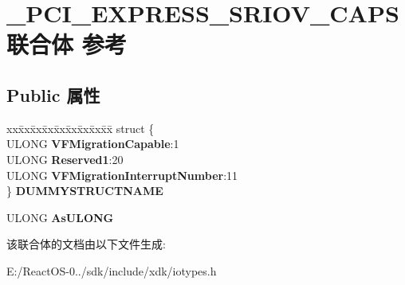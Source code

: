 \hypertarget{union___p_c_i___e_x_p_r_e_s_s___s_r_i_o_v___c_a_p_s}{}\section{\+\_\+\+P\+C\+I\+\_\+\+E\+X\+P\+R\+E\+S\+S\+\_\+\+S\+R\+I\+O\+V\+\_\+\+C\+A\+P\+S联合体 参考}
\label{union___p_c_i___e_x_p_r_e_s_s___s_r_i_o_v___c_a_p_s}
\subsection*{Public 属性}
\begin{DoxyCompactItemize}
\item 
\mbox{\label{union___p_c_i___e_x_p_r_e_s_s___s_r_i_o_v___c_a_p_s_aa59592eaa44a15106027a77832c27405}} 
\begin{tabbing}
xx\=xx\=xx\=xx\=xx\=xx\=xx\=xx\=xx\=\kill
struct \{\\
\>ULONG {\bfseries VFMigrationCapable}:1\\
\>ULONG {\bfseries Reserved1}:20\\
\>ULONG {\bfseries VFMigrationInterruptNumber}:11\\
\} {\bfseries DUMMYSTRUCTNAME}\\

\end{tabbing}\item 
\mbox{\label{union___p_c_i___e_x_p_r_e_s_s___s_r_i_o_v___c_a_p_s_ae9ab31421f89ddd24c4e2b2f3b1149ce}} 
U\+L\+O\+NG {\bfseries As\+U\+L\+O\+NG}
\end{DoxyCompactItemize}


该联合体的文档由以下文件生成\+:\begin{DoxyCompactItemize}
\item 
E\+:/\+React\+O\+S-\/0../sdk/include/xdk/iotypes.\+h\end{DoxyCompactItemize}
